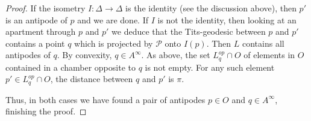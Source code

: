 \documentclass[12pt,leqno]{amsart}
\numberwithin{equation}{section}
\newtheorem{lem}[thm]{Lemma}
\theoremstyle{remark}
\begin{document}
\begin{proof}
If the isometry $I:\Delta \to \Delta$ is the identity (see the discussion above), then $p'$ is an antipode of $p$ and we are done.  If $I$ is not the identity, then looking at an apartment through $p$ and $p'$ we deduce that the Tits-geodesic between $p$ and $p'$ contains a point $q$ which is projected by $\mathcal P$ onto $I(p)$.  Then  $L$ contains all antipodes of $q$. By convexity, $q\in A^{\infty}$. As above, the set 
 $L^{op} _q \cap O$ of elements in $O$  contained in a chamber opposite to $q$ is not empty.
 For any such element $p'\in L^{op} _q\cap O$, the distance between $q$ and $p'$ is $\pi$.
 
 Thus, in both cases we have found a pair of antipodes $p\in O$ and $q\in A^{\infty}$, finishing the proof. 
\end{proof}


	

	



\end{document}

